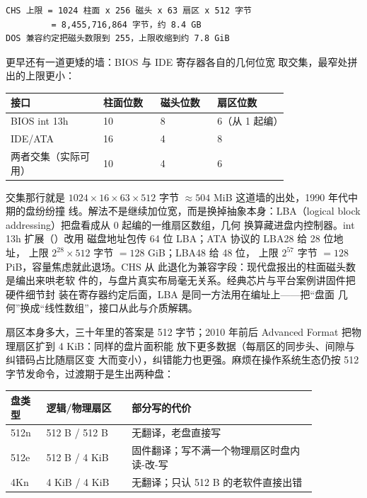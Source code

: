 \begin{lstlisting}
CHS 上限 = 1024 柱面 x 256 磁头 x 63 扇区 x 512 字节
         = 8,455,716,864 字节，约 8.4 GB
DOS 兼容约定把磁头数限到 255，上限收缩到约 7.8 GiB
\end{lstlisting}

更早还有一道更矮的墙：BIOS 与 IDE 寄存器各自的几何位宽
取交集，最窄处拼出的上限更小：

\begin{longtable}{L{0.26\linewidth}L{0.16\linewidth}L{0.16\linewidth}L{0.2\linewidth}}
\toprule
接口 & 柱面位数 & 磁头位数 & 扇区位数 \\
\midrule
BIOS int 13h & 10 & 8 & 6（从 1 起编） \\\tablerowrule
IDE/ATA & 16 & 4 & 8 \\\tablerowrule
两者交集（实际可用） & 10 & 4 & 6 \\
\bottomrule
\end{longtable}

交集那行就是 $1024\times16\times63\times512$ 字节
$\approx504$ MiB 这道墙的出处，1990 年代中期的盘纷纷撞
线。解法不是继续加位宽，而是换掉抽象本身：LBA（logical
block addressing）把盘看成从 0 起编的一维扇区数组，几何
换算藏进盘内控制器。int 13h 扩展（）改用
磁盘地址包传 64 位 LBA；ATA 协议的 LBA28 给 28 位地址，
上限 $2^{28}\times512$ 字节 $=128$ GiB；LBA48 给 48 位，
上限 $2^{57}$ 字节 $=128$ PiB，容量焦虑就此退场。CHS 从
此退化为兼容字段：现代盘报出的柱面磁头数是编出来哄老软
件的，与盘片真实布局毫无关系。经典芯片与平台案例讲固件把硬件细节封
装在寄存器约定后面，LBA 是同一方法用在编址上——把“盘面
几何”换成“线性数组”，接口从此与介质解耦。

扇区本身多大，三十年里的答案是 512 字节；2010 年前后
Advanced Format 把物理扇区扩到 4 KiB：同样的盘片面积能
放下更多数据（每扇区的同步头、间隙与纠错码占比随扇区变
大而变小），纠错能力也更强。麻烦在操作系统生态仍按 512
字节发命令，过渡期于是生出两种盘：

\begin{longtable}{L{0.1\linewidth}L{0.24\linewidth}L{0.52\linewidth}}
\toprule
盘类型 & 逻辑/物理扇区 & 部分写的代价 \\
\midrule
512n & 512 B / 512 B & 无翻译，老盘直接写 \\\tablerowrule
512e & 512 B / 4 KiB & 固件翻译；写不满一个物理扇区时盘内读-改-写 \\\tablerowrule
4Kn & 4 KiB / 4 KiB & 无翻译；只认 512 B 的老软件直接出错 \\
\bottomrule
\end{longtable}

